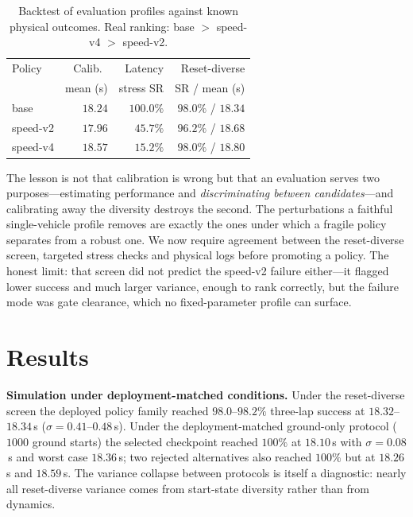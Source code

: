 \documentclass[10pt, twocolumn]{article}
\begin{document}
\begin{table}[t]
\centering
\footnotesize
\caption{Backtest of evaluation profiles against known physical outcomes.
Real ranking: base $>$ speed-v4 $>$ speed-v2.}
\label{tab:backtest}
\begin{tabular}{@{}l r r r@{}}
\toprule
Policy & Calib.\ & Latency & Reset-diverse \\
       & mean (s) & stress SR & SR / mean (s) \\
\midrule
base     & $18.24$ & $100.0\%$ & $98.0\%$ / $18.34$ \\
speed-v2 & $\mathbf{17.96}$ & $45.7\%$ & $96.2\%$ / $18.68$ \\
speed-v4 & $18.57$ & $15.2\%$ & $98.0\%$ / $18.80$ \\
\bottomrule
\end{tabular}
\end{table}

The lesson is not that calibration is wrong but that an evaluation serves two
purposes---estimating performance and \emph{discriminating between
candidates}---and calibrating away the diversity destroys the second. The
perturbations a faithful single-vehicle profile removes are exactly the ones
under which a fragile policy separates from a robust one. We now require
agreement between the reset-diverse screen, targeted stress checks and physical
logs before promoting a policy. The honest limit: that screen did not predict
the speed-v2 failure either---it flagged lower success and much larger
variance, enough to rank correctly, but the failure mode was gate clearance,
which no fixed-parameter profile can surface.

\section{Results}

\textbf{Simulation under deployment-matched conditions.} Under the
reset-diverse screen the deployed policy family reached $98.0$--$98.2\%$
three-lap success at $18.32$--$18.34$\,s ($\sigma = 0.41$--$0.48$\,s). Under
the deployment-matched ground-only protocol ($1000$ ground starts) the selected
checkpoint reached $100\%$ at $18.10$\,s with $\sigma = 0.08$\,s and worst
case $18.36$\,s; two rejected alternatives also reached $100\%$ but at
$18.26$\,s and $18.59$\,s. The variance collapse between protocols is itself a
diagnostic: nearly all reset-diverse variance comes from start-state diversity
rather than from dynamics.
\end{document}
